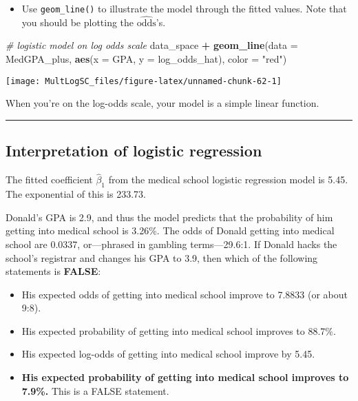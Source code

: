 \documentclass[]{book}
\newenvironment{Shaded}{\begin{snugshade}}{\end{snugshade}}
\newcommand{\KeywordTok}[1]{\textcolor[rgb]{0.13,0.29,0.53}{\textbf{#1}}}
\newcommand{\DataTypeTok}[1]{\textcolor[rgb]{0.13,0.29,0.53}{#1}}
\newcommand{\StringTok}[1]{\textcolor[rgb]{0.31,0.60,0.02}{#1}}
\newcommand{\CommentTok}[1]{\textcolor[rgb]{0.56,0.35,0.01}{\textit{#1}}}
\newcommand{\OperatorTok}[1]{\textcolor[rgb]{0.81,0.36,0.00}{\textbf{#1}}}
\newcommand{\NormalTok}[1]{#1}
\providecommand{\tightlist}{%
  \setlength{\itemsep}{0pt}\setlength{\parskip}{0pt}}
\begin{document}
\begin{itemize}
\tightlist
\item
  Use \texttt{geom\_line()} to illustrate the model through the fitted
  values. Note that you should be plotting the
  \(\widehat{\text{odds}}\)'s.
\end{itemize}

\begin{Shaded}
\begin{Highlighting}[]
\CommentTok{# logistic model on log odds scale}
\NormalTok{data_space }\OperatorTok{+}
\StringTok{  }\KeywordTok{geom_line}\NormalTok{(}\DataTypeTok{data =}\NormalTok{ MedGPA_plus, }\KeywordTok{aes}\NormalTok{(}\DataTypeTok{x =}\NormalTok{ GPA, }\DataTypeTok{y =}\NormalTok{ log_odds_hat), }\DataTypeTok{color =} \StringTok{"red"}\NormalTok{)}
\end{Highlighting}
\end{Shaded}

\begin{center}\texttt{[image: MultLogSC\_files/figure-latex/unnamed-chunk-62-1]} \end{center}

When you're on the log-odds scale, your model is a simple linear
function.

\begin{center}\rule{0.5\linewidth}{\linethickness}\end{center}

\subsection*{Interpretation of logistic
regression}\label{interpretation-of-logistic-regression}

The fitted coefficient \(\hat\beta_1\) from the medical school logistic
regression model is 5.45. The exponential of this is 233.73.

Donald's GPA is 2.9, and thus the model predicts that the probability of
him getting into medical school is 3.26\%. The odds of Donald getting
into medical school are 0.0337, or---phrased in gambling terms---29.6:1.
If Donald hacks the school's registrar and changes his GPA to 3.9, then
which of the following statements is \textbf{FALSE}:

\begin{itemize}
\item
  His expected odds of getting into medical school improve to 7.8833 (or
  about 9:8).
\item
  His expected probability of getting into medical school improves to
  88.7\%.
\item
  His expected log-odds of getting into medical school improve by 5.45.
\item
  \textbf{His expected probability of getting into medical school
  improves to 7.9\%.} This is a FALSE statement.
\end{itemize}
\end{document}
